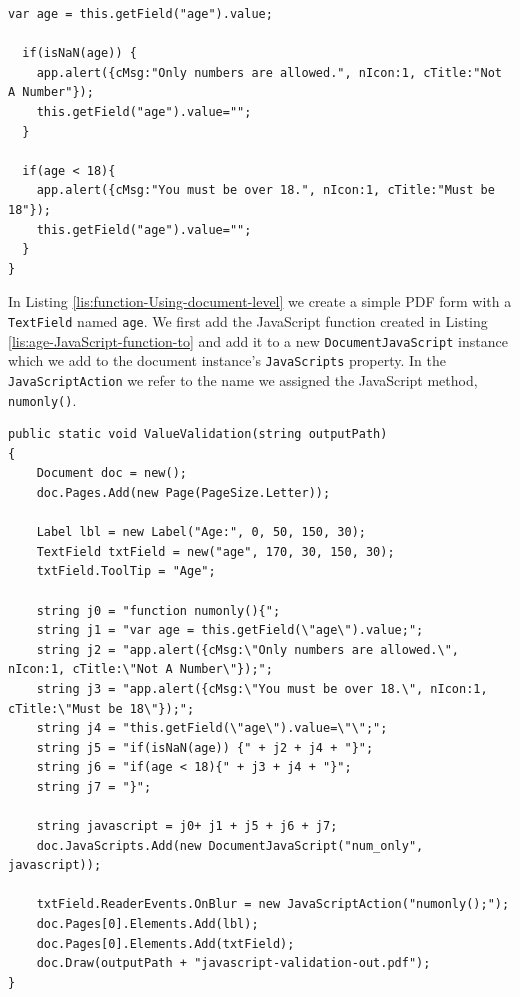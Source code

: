 \documentclass[american,letterpaper]{tufte-book}
\numberwithin{equation}{section}
\numberwithin{figure}{section}
\begin{document}
{{\begin{lstlisting}[caption={JavaScript function to validate age.},label={lis:age-JavaScript-function-to},basicstyle={\small\ttfamily},breaklines=true]
  var age = this.getField("age").value;

  if(isNaN(age)) {
    app.alert({cMsg:"Only numbers are allowed.", nIcon:1, cTitle:"Not A Number"});
    this.getField("age").value="";
  }

  if(age < 18){
    app.alert({cMsg:"You must be over 18.", nIcon:1, cTitle:"Must be 18"});
    this.getField("age").value="";
  }
}
\end{lstlisting}
\leavevmode\egroup

In Listing \ref{lis:function-Using-document-level} we create a simple
PDF form with a \texttt{TextField} named \texttt{age}. We first add
the JavaScript function created in Listing \ref{lis:age-JavaScript-function-to}
and add it to a new \texttt{DocumentJavaScript} instance which we
add to the document instance's \texttt{JavaScripts} property. In the
\texttt{JavaScriptAction} we refer to the name we assigned the JavaScript
method, \texttt{numonly()}.

\bgroup{}
\begin{lstlisting}[caption={Using document level function.},label={lis:function-Using-document-level},basicstyle={\small\ttfamily},breaklines=true]
public static void ValueValidation(string outputPath)
{
    Document doc = new();
    doc.Pages.Add(new Page(PageSize.Letter));

    Label lbl = new Label("Age:", 0, 50, 150, 30);
    TextField txtField = new("age", 170, 30, 150, 30);
    txtField.ToolTip = "Age";

    string j0 = "function numonly(){";
    string j1 = "var age = this.getField(\"age\").value;";
    string j2 = "app.alert({cMsg:\"Only numbers are allowed.\", nIcon:1, cTitle:\"Not A Number\"});";
    string j3 = "app.alert({cMsg:\"You must be over 18.\", nIcon:1, cTitle:\"Must be 18\"});";
    string j4 = "this.getField(\"age\").value=\"\";";
    string j5 = "if(isNaN(age)) {" + j2 + j4 + "}";
    string j6 = "if(age < 18){" + j3 + j4 + "}";
    string j7 = "}";

    string javascript = j0+ j1 + j5 + j6 + j7;
    doc.JavaScripts.Add(new DocumentJavaScript("num_only", javascript));

    txtField.ReaderEvents.OnBlur = new JavaScriptAction("numonly();");
    doc.Pages[0].Elements.Add(lbl);
    doc.Pages[0].Elements.Add(txtField);
    doc.Draw(outputPath + "javascript-validation-out.pdf");
}
\end{lstlisting}
\leavevmode\egroup

}}
\end{document}
